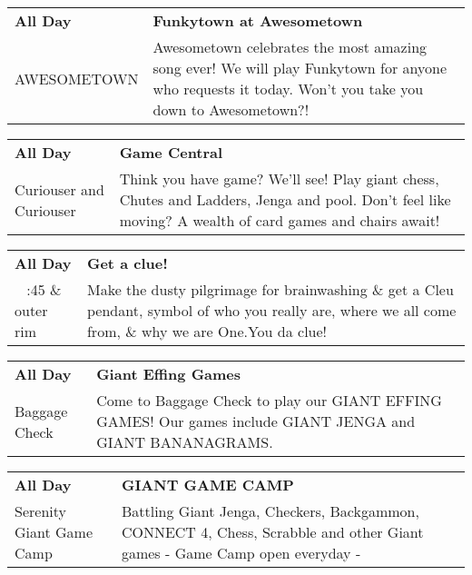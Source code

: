 \begin{tabular}{ p{1in} p{2.2in} }
    \textbf{All Day} & \textbf{Funkytown at Awesometown} \\
    AWESOMETOWN \newline  & Awesometown celebrates the most amazing song ever! We will play Funkytown for anyone who requests it today. Won't you take you down to Awesometown?! \\
    \hline 
\end{tabular}
    
\begin{tabular}{ p{1in} p{2.2in} }
    \textbf{All Day} & \textbf{Game Central} \\
    Curiouser and Curiouser \newline  & Think you have game? We'll see! Play giant chess, Chutes and Ladders, Jenga and pool. Don't feel like moving? A wealth of card games and chairs await! \\
    \hline 
\end{tabular}
    
\begin{tabular}{ p{1in} p{2.2in} }
    \textbf{All Day} & \textbf{Get a clue!} \\
    ~ \newline 3:45 \& outer rim & Make the dusty pilgrimage for brainwashing \& get a Cleu pendant, symbol of who you really are, where we all come from, \& why we are One.You da clue! \\
    \hline 
\end{tabular}
    
\begin{tabular}{ p{1in} p{2.2in} }
    \textbf{All Day} & \textbf{Giant Effing Games} \\
    Baggage Check \newline  & Come to Baggage Check to play our GIANT EFFING GAMES! Our games include GIANT JENGA and GIANT BANANAGRAMS. \\
    \hline 
\end{tabular}
    
\begin{tabular}{ p{1in} p{2.2in} }
    \textbf{All Day} & \textbf{GIANT GAME CAMP} \\
    Serenity Giant Game Camp \newline  & Battling Giant Jenga, Checkers, Backgammon, CONNECT 4, Chess, Scrabble and other Giant games - Game Camp open everyday - \\
    \hline 
\end{tabular}
    
